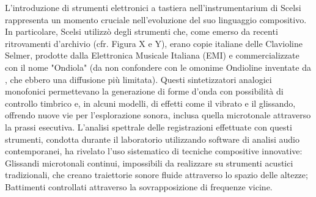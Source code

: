 L'introduzione di strumenti elettronici a tastiera nell'instrumentarium di Scelsi rappresenta un momento cruciale nell'evoluzione del suo linguaggio compositivo. In particolare, Scelsi utilizzò degli strumenti che, come emerso da recenti ritrovamenti d'archivio (cfr. Figura X e Y), erano copie italiane delle Clavioline Selmer, prodotte dalla Elettronica Musicale Italiana (EMI) e commercializzate con il nome "Ondiola" (da non confondere con le omonime Ondioline inventate da , che ebbero una diffusione più limitata). Questi sintetizzatori analogici monofonici permettevano la generazione di forme d'onda con possibilità di controllo timbrico e, in alcuni modelli, di effetti come il vibrato e il glissando, offrendo nuove vie per l'esplorazione sonora, inclusa quella microtonale attraverso la prassi esecutiva.
L'analisi spettrale delle registrazioni effettuate con questi strumenti, condotta durante il laboratorio utilizzando software di analisi audio contemporanei, ha rivelato l'uso sistematico di tecniche compositive innovative: Glissandi microtonali continui, impossibili da realizzare su strumenti acustici tradizionali, che creano traiettorie sonore fluide attraverso lo spazio delle altezze; Battimenti controllati attraverso la sovrapposizione di frequenze vicine.